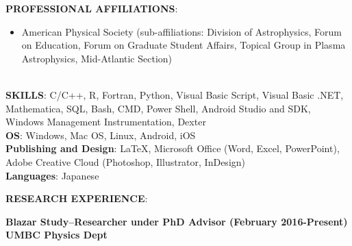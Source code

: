 \documentclass{article}
\begin{document}
\noindent \textbf{PROFESSIONAL AFFILIATIONS}:
\begin{itemize}
\item American Physical Society (sub-affiliations: Division of Astrophysics, Forum on Education, Forum on Graduate Student Affairs, Topical Group in Plasma Astrophysics, Mid-Atlantic Section)
\end{itemize}
\phantom \\
\noindent \textbf{SKILLS}: C/C++, R, Fortran, Python, Visual Basic Script, Visual Basic .NET, Mathematica, SQL, Bash, CMD, Power Shell, Android Studio and SDK, Windows Management Instrumentation, Dexter\\
\noindent \textbf{OS}: Windows, Mac OS, Linux, Android, iOS\\
\noindent \textbf{Publishing and Design}: LaTeX, Microsoft Office (Word, Excel, PowerPoint), Adobe Creative Cloud (Photoshop, Illustrator, InDesign)\\
\noindent \textbf{Languages}: Japanese\\
\newline 
\par 
\noindent \textbf{RESEARCH EXPERIENCE}:\\
\begin{vwcol}[widths={0.8,0.2}, sep=.8cm, justify=flush, rule=0pt, indent=0em]
\noindent \textbf{Blazar Study–Researcher under PhD Advisor (February 2016-Present)}
\newpage
\noindent \textbf{UMBC Physics Dept}
\end{vwcol}
\end{document}
